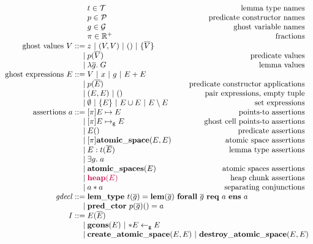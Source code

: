 \documentclass{article}
\newcommand{\gmapsto}{\mapsto_\mathsf{g}}
\newcommand{\internal}[1]{{\color{purple} #1}}
\begin{document}
\begin{figure}
$$\begin{array}{r @{\;} l r}
& t \in \mathcal{T} & \textrm{lemma type names}\\
& p \in \mathcal{P} & \textrm{predicate constructor names}\\
& g \in \mathcal{G} & \textrm{ghost variable names}\\
& \pi \in \mathbb{R}^+ & \textrm{fractions}\\
\textrm{ghost values $V$} ::= & z\ |\ (V, V)\ |\ ()\ |\ \{\overline{V}\}\\
| & p(\overline{V}) & \textrm{predicate values}\\
| & \lambda \overline{g}.\;G & \textrm{lemma values}\\
\textrm{ghost expressions $E$} ::= & V\ |\ x\ |\ g\ |\ E + E\\
| & p(\overline{E}) & \textrm{predicate constructor applications}\\
| & (E, E)\ |\ () & \textrm{pair expressions, empty tuple}\\
| & \emptyset\ |\ \{E\}\ |\ E \cup E\ |\ E \setminus E & \textrm{set expressions}\\
\textrm{assertions $a$} ::= & [\pi]E \mapsto E & \textrm{points-to assertions}\\
| & [\pi]E \gmapsto E & \textrm{ghost cell points-to assertions}\\
| & E() & \textrm{predicate assertions}\\
| & [\pi]\mathbf{atomic\_space}(E, E) & \textrm{atomic space assertions}\\
| & E : t(\overline{E}) & \textrm{lemma type assertions}\\
| & \exists g.\;a\\
| & \mathbf{atomic\_spaces}(E) & \textrm{atomic spaces assertions}\\
| & \internal{\mathbf{heap}(E)} & \textrm{heap chunk assertions}\\
| & a * a & \textrm{separating conjunctions}\\
\mathit{gdecl} ::= & \multicolumn{2}{@{} l @{}}{\mathbf{lem\_type}\ t(\overline{g}) = \mathbf{lem}(\overline{g})\ \mathbf{forall}\ \overline{g}\ \mathbf{req}\ a\ \mathbf{ens}\ a}\\
| & \mathbf{pred\_ctor}\ p(\overline{g})() = a\\
I ::= & E(\overline{E})\\
| & \mathbf{gcons}(E)\ |\ {*}E \leftarrow_\mathsf{g} E\\
| & \multicolumn{2}{@{} l @{}}{\mathbf{create\_atomic\_space}(E, E)\ |\ \mathbf{destroy\_atomic\_space}(E, E)}\\

\end{array}$$
\end{figure}
\end{document}

